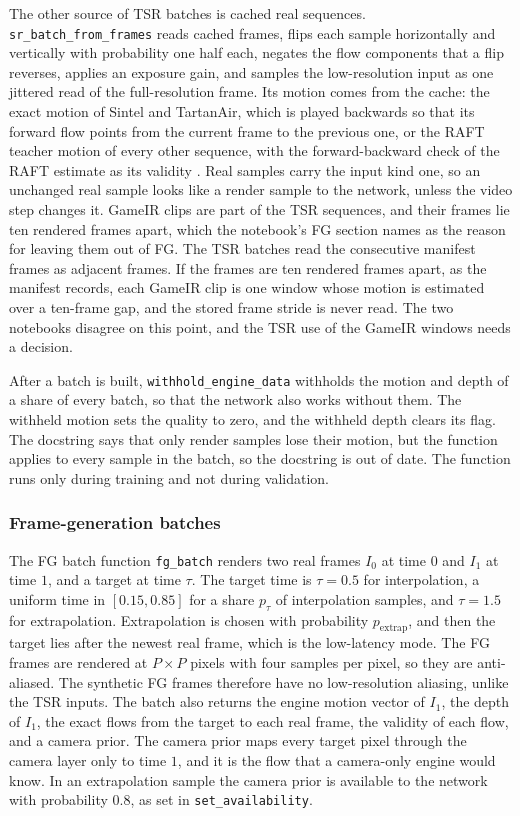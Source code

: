 The other source of TSR batches is cached real sequences. \texttt{sr\_batch\_from\_frames} reads cached frames, flips each sample horizontally and vertically with probability one half each, negates the flow components that a flip reverses, applies an exposure gain, and samples the low-resolution input as one jittered read of the full-resolution frame. Its motion comes from the cache: the exact motion of Sintel and TartanAir, which is played backwards so that its forward flow points from the current frame to the previous one, or the RAFT teacher motion of every other sequence, with the forward-backward check of the RAFT estimate as its validity \cite{teed2020raft}. Real samples carry the input kind one, so an unchanged real sample looks like a render sample to the network, unless the video step changes it. GameIR clips are part of the TSR sequences, and their frames lie ten rendered frames apart, which the notebook's FG section names as the reason for leaving them out of FG. The TSR batches read the consecutive manifest frames as adjacent frames. If the frames are ten rendered frames apart, as the manifest records, each GameIR clip is one window whose motion is estimated over a ten-frame gap, and the stored frame stride is never read. The two notebooks disagree on this point, and the TSR use of the GameIR windows needs a decision. \UnderRevision

After a batch is built, \texttt{withhold\_engine\_data} withholds the motion and depth of a share of every batch, so that the network also works without them. The withheld motion sets the quality to zero, and the withheld depth clears its flag. The docstring says that only render samples lose their motion, but the function applies to every sample in the batch, so the docstring is out of date. The function runs only during training and not during validation.

\subsubsection{Frame-generation batches}\label{sec:data-synth-fg}

The FG batch function \texttt{fg\_batch} renders two real frames $I_0$ at time $0$ and $I_1$ at time $1$, and a target at time $\tau$. The target time is $\tau=0.5$ for interpolation, a uniform time in $[0.15,0.85]$ for a share $p_{\tau}$ of interpolation samples, and $\tau=1.5$ for extrapolation. Extrapolation is chosen with probability $p_{\mathrm{extrap}}$, and then the target lies after the newest real frame, which is the low-latency mode. The FG frames are rendered at $P\times P$ pixels with four samples per pixel, so they are anti-aliased. The synthetic FG frames therefore have no low-resolution aliasing, unlike the TSR inputs. The batch also returns the engine motion vector of $I_1$, the depth of $I_1$, the exact flows from the target to each real frame, the validity of each flow, and a camera prior. The camera prior maps every target pixel through the camera layer only to time $1$, and it is the flow that a camera-only engine would know. In an extrapolation sample the camera prior is available to the network with probability $0.8$, as set in \texttt{set\_availability}.

